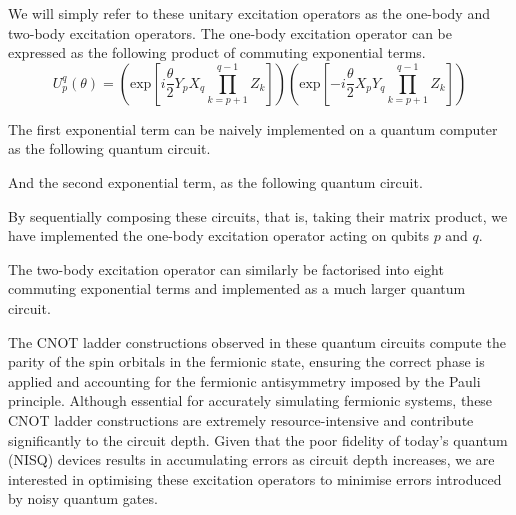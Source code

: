 We will simply refer to these unitary excitation operators as the one-body and two-body excitation operators. The one-body excitation operator can be expressed as the following product of commuting exponential terms.
\begin{equation*}
    U^q_p (\theta) =
    \left( \text{exp} \left[
    i \frac{\theta}{2} Y_p X_q \prod_{k=p+1}^{q-1} Z_k \right] \right)
    \left( \text{exp} \left[ -
    i \frac{\theta}{2} X_p Y_q \prod_{k=p+1}^{q-1} Z_k \right] \right)
\end{equation*}

The first exponential term can be naively implemented on a quantum computer as the following quantum circuit.


And the second exponential term, as the following quantum circuit.


By sequentially composing these circuits, that is, taking their matrix product, we have implemented the one-body excitation operator acting on qubits $p$ and $q$.


The two-body excitation operator can similarly be factorised into eight commuting exponential terms and implemented as a much larger quantum circuit.


The CNOT ladder constructions observed in these quantum circuits compute the parity of the spin orbitals in the fermionic state, ensuring the correct phase is applied and accounting for the fermionic antisymmetry imposed by the Pauli principle. Although essential for accurately simulating fermionic systems, these CNOT ladder constructions are extremely resource-intensive and contribute significantly to the circuit depth. Given that the poor fidelity of today's quantum (NISQ) devices results in accumulating errors as circuit depth increases, we are interested in optimising these excitation operators to minimise errors introduced by noisy quantum gates.

